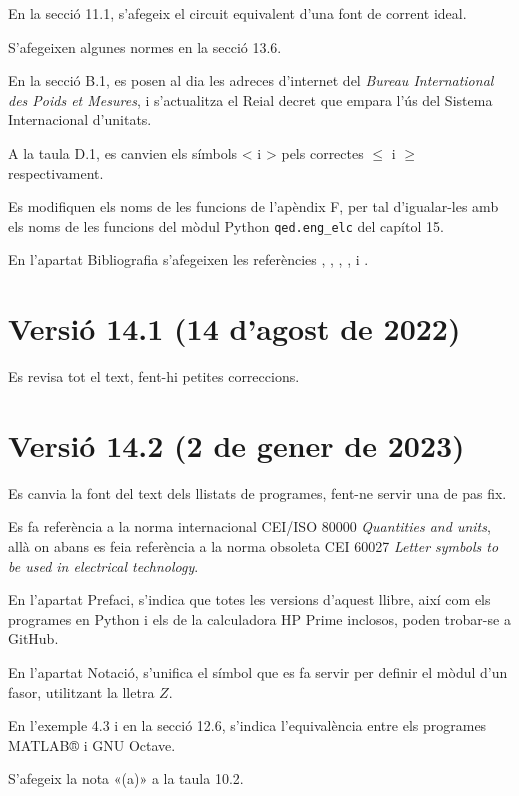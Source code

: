 En la secció 11.1, s'afegeix el circuit equivalent d'una font de corrent ideal.

S'afegeixen algunes normes en la secció 13.6.

En la secció B.1, es posen al dia les adreces d'internet  del \textit{Bureau International des Poids et Mesures}, i s'actualitza el Reial decret que empara l'ús del Sistema Internacional d'unitats.

A la taula D.1, es canvien els símbols < i > pels correctes $\leq$ i $\geq$ respectivament.

Es modifiquen els noms de les funcions de l'apèndix F, per tal d'igualar-les amb els noms de les funcions del mòdul Python \texttt{qed.eng\_elc} del capítol 15.

En l'apartat Bibliografia s'afegeixen les referències \cite{SUM},  \cite{RAM}, \cite{JOH}, \cite{HIL}, \cite{ZUM} i \cite{VAN}.



\section*{Versió 14.1 (14 d'agost de 2022)}

Es revisa tot el text, fent-hi petites correccions.


\section*{Versió 14.2 (2 de gener de 2023)}

Es canvia la font del text dels llistats de programes, fent-ne servir una de pas fix.

Es fa referència a  la norma internacional CEI/ISO 80000 \textit{Quantities and units}, allà on abans es feia referència  a la norma obsoleta CEI 60027 \textit{Letter symbols to be used in electrical technology}.

En l'apartat Prefaci, s'indica que totes les versions d'aquest llibre, així com els programes en Python i els de la calculadora \textsf{HP Prime} inclosos, poden trobar-se a GitHub.

En l'apartat Notació, s'unifica el símbol que es fa servir per definir el mòdul d'un fasor, utilitzant la lletra $Z$.

En l'exemple 4.3 i en la secció  12.6, s'indica l'equivalència entre els programes MATLAB® i GNU Octave.

S'afegeix la nota «(a)» a la taula 10.2.

